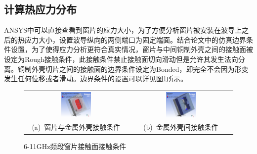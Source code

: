 \documentclass[master]{thesis-uestc}
\begin{document}
\subsection{计算热应力分布}
ANSYS中可以直接查看到窗片的应力大小，为了方便分析窗片被安装在波导上之后的热应力大小，设置波导纵向的两侧端口为固定端面。结合论文\cite{dajunzhao_capasity_2023}中的仿真边界条件设置，为了使得应力分析更符合真实情况，窗片与中间铜制外壳之间的接触面被设定为Rough接触条件，此接触条件禁止接触面切向滑动但是允许其发生法向分离。铜制外壳切片之间的接触面的边界条件设定为Bonded，即完全不会因为形变发生任何位移或者滑动。边界条件的设置可以详见图\ref{fig:X频段接触面边界条件}所示。
\begin{figure}[!htb]
    \small
    \centering
    \begin{tabular}{@{\ }c@{\ }c}
        \includegraphics[width=0.3\textwidth]{pic/chapter3/金属外壳2与窗片间的接触条件.png} & 
        \hspace{5pt}
        \includegraphics[width=0.3\textwidth]{pic/chapter3/金属外壳3与2之间的接触条件.png}     \\
        \mbox{\small (a) 窗片与金属外壳接触条件}                                                                               & 
        \mbox{\small (b) 金属外壳间接触条件}                                                                                  \\
    \end{tabular}
    \caption{6-11GHz频段窗片接触面接触条件}
    \label{fig:X频段接触面边界条件}
\end{figure}
\end{document}
